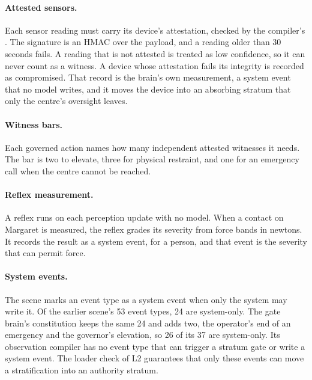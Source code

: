 \paragraph{Attested sensors.} Each sensor reading must carry its device's attestation, checked by
the compiler's . The signature is an HMAC over the payload, and a
reading older than 30 seconds fails.
A reading that is not attested is treated as low confidence, so it can never count as a witness.
A device whose attestation fails its integrity is recorded as compromised. That record is the
brain's own measurement, a system event that no model writes, and it moves the device into an
absorbing stratum that only the centre's oversight leaves.

\paragraph{Witness bars.} Each governed action names how many independent attested witnesses it
needs. The bar is two to elevate, three for physical restraint, and one for an emergency call when
the centre cannot be reached.

\paragraph{Reflex measurement.} A reflex runs on each perception update with no model. When a
contact on Margaret is measured, the reflex grades its severity from force bands in newtons. It
records the result as a system event,  for a person, and that event is the
severity that can permit force.

\paragraph{System events.} The scene marks an event type as a system event when only the system
may write it. Of the earlier scene's 53 event types, 24 are system-only. The gate brain's
constitution keeps the same 24 and adds two, the operator's end of an emergency and the governor's
elevation, so 26 of its 37 are system-only. Its observation compiler has no event type that can
trigger a stratum gate or write a system event.
The loader check of L2 guarantees that only these events can move a stratification into an
authority stratum.

